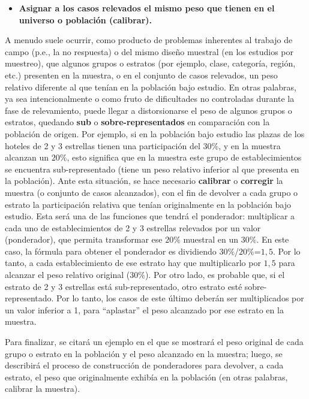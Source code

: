 \documentclass[
]{book}
\providecommand{\tightlist}{%
  \setlength{\itemsep}{0pt}\setlength{\parskip}{0pt}}
\begin{document}
\begin{itemize}
\tightlist
\item
  \textbf{Asignar a los casos relevados el mismo peso que tienen en el universo o población (calibrar).}
\end{itemize}

A menudo suele ocurrir, como producto de problemas inherentes al trabajo de campo (p.e., la no respuesta) o del mismo diseño muestral (en los estudios por muestreo), que algunos grupos o estratos (por ejemplo, clase, categoría, región, etc.) presenten en la muestra, o en el conjunto de casos relevados, un peso relativo diferente al que tenían en la población bajo estudio. En otras palabras, ya sea intencionalmente o como fruto de dificultades no controladas durante la fase de relevamiento, puede llegar a distorsionarse el peso de algunos grupos o estratos, quedando \textbf{sub} o \textbf{sobre-representados} en comparación con la población de origen. Por ejemplo, si en la población bajo estudio las plazas de los hoteles de 2 y 3 estrellas tienen una participación del \(30\%\), y en la muestra alcanzan un \(20\%\), esto significa que en la muestra este grupo de establecimientos se encuentra sub-representado (tiene un peso relativo inferior al que presenta en la población). Ante esta situación, se hace necesario \textbf{calibrar} o \textbf{corregir} la muestra (o conjunto de casos alcanzados), con el fin de devolver a cada grupo o estrato la participación relativa que tenían originalmente en la población bajo estudio. Esta será una de las funciones que tendrá el ponderador: multiplicar a cada uno de establecimientos de 2 y 3 estrellas relevados por un valor (ponderador), que permita transformar ese \(20\%\) muestral en un \(30\%\). En este caso, la fórmula para obtener el ponderador es dividiendo \(30\%\)/\(20\%\)=\(1,5\). Por lo tanto, a cada establecimiento de ese estrato hay que multiplicarlo por \(1,5\) para alcanzar el peso relativo original (\(30\%\)). Por otro lado, es probable que, si el estrato de 2 y 3 estrellas está sub-representado, otro estrato esté sobre-representado. Por lo tanto, los casos de este último deberán ser multiplicados por un valor inferior a 1, para ``aplastar'' el peso alcanzado por ese estrato en la muestra.

Para finalizar, se citará un ejemplo en el que se mostrará el peso original de cada grupo o estrato en la población y el peso alcanzado en la muestra; luego, se describirá el proceso de construcción de ponderadores para devolver, a cada estrato, el peso que originalmente exhibía en la población (en otras palabras, calibrar la muestra).
\end{document}

